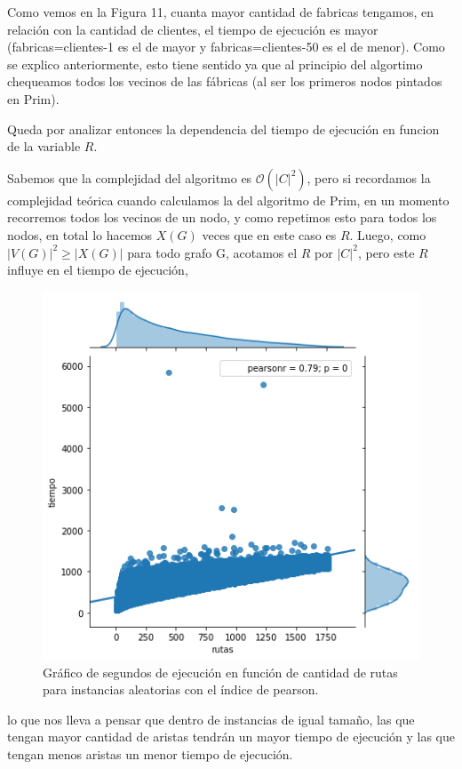 \documentclass[A4paper,oneside,fleqn,11pt]{article}
\theoremstyle{definition}
\begin{document}
Como vemos en la Figura 11, cuanta mayor cantidad de fabricas tengamos, en relación con la cantidad de clientes, el tiempo de ejecución es mayor (fabricas=clientes-1 es el de mayor y fabricas=clientes-50 es el de menor). Como se explico anteriormente, esto tiene sentido ya que al principio del algortimo chequeamos todos los vecinos de las fábricas (al ser los primeros nodos pintados en Prim).

Queda por analizar entonces la dependencia del tiempo de ejecución en funcion de la variable $R$.
 
 

 Sabemos que la complejidad del algoritmo es $\mathcal{O} (|C|^2)$, pero si recordamos la complejidad teórica cuando calculamos la del algoritmo de Prim, en un momento recorremos todos los vecinos de un nodo, y como repetimos esto para todos los nodos, en total lo hacemos $X(G)$ veces que en este caso es $R$. Luego, como $|V(G)|^2 \geq |X(G)|$ para todo grafo G, acotamos el $R$ por $|C|^2$, pero este $R$ influye en el tiempo de ejecución,

 
 
 \begin{figure}
\centering
\includegraphics[scale=0.4]{pearson.png}
\caption{ Gráfico de segundos de ejecución en función de cantidad de rutas para instancias aleatorias con el índice de pearson.}
\end{figure}
 
 
 
  
 lo que nos lleva a pensar que dentro de instancias de igual tamaño, las que tengan mayor cantidad de aristas tendrán un mayor tiempo de ejecución y las que tengan menos aristas un menor tiempo de ejecución.
\end{document}
